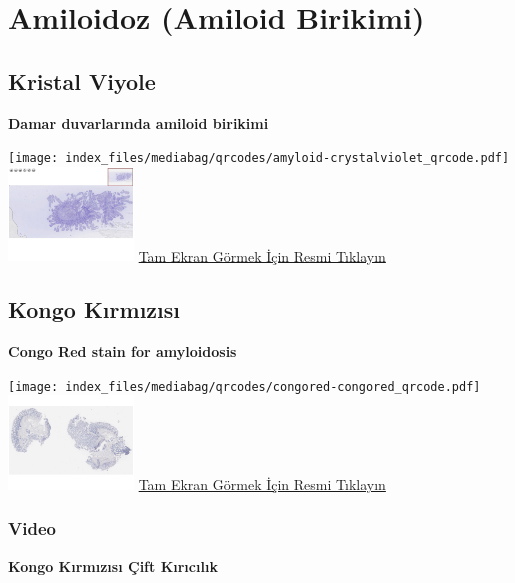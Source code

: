 \documentclass[
  letterpaper,
  DIV=11,
  numbers=noendperiod]{scrreprt}
\begin{document}
\chapter{Amiloidoz (Amiloid Birikimi)}\label{sec-amiloidoz}

\section{Kristal Viyole}\label{sec-amiloidoz-kristal-viyole}

\textbf{Damar duvarlarında amiloid birikimi}

\texttt{[image: index\_files/mediabag/qrcodes/amyloid-crystalviolet\_qrcode.pdf]}
\href{https://images.patolojiatlasi.com/amyloid/crystalviolet.html}{\includegraphics[width=0.25\textwidth,height=\textheight]{./screenshots/thumbnail_crystalviolet.png}}
\href{https://images.patolojiatlasi.com/amyloid/crystalviolet.html}{Tam
Ekran Görmek İçin Resmi Tıklayın}

\section{Kongo Kırmızısı}\label{sec-amiloidoz-kongo-kirmizisi}

\textbf{Congo Red stain for amyloidosis}

\texttt{[image: index\_files/mediabag/qrcodes/congored-congored\_qrcode.pdf]}
\href{https://images.patolojiatlasi.com/congored/congored.html}{\includegraphics[width=0.25\textwidth,height=\textheight]{./screenshots/thumbnail_congored.png}}
\href{https://images.patolojiatlasi.com/congored/congored.html}{Tam
Ekran Görmek İçin Resmi Tıklayın}

\subsection{Video}\label{video}

\textbf{Kongo Kırmızısı Çift Kırıcılık}
\end{document}
